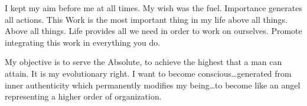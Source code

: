 \documentclass[12pt,letterpaper]{book}
\begin{document}
I kept my aim before me at all times. My wish was the fuel. Importance generates all actions. This Work is the most important thing in my life above all things. Above all things. Life provides all we need in order to work on ourselves. Promote integrating this work in everything you do.

My objective is to serve the Absolute, to achieve the highest that a man can attain. It is my evolutionary right. I want to become conscious…generated from inner authenticity which permanently modifies my being…to become like an angel representing a higher order of organization.



\chapter{}
\end{document}
